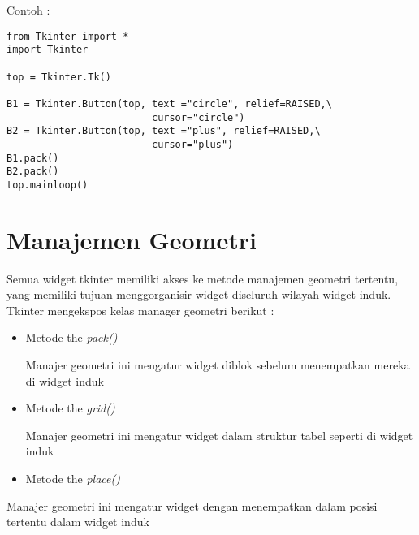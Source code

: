 \documentclass [12pt,a4paper,notitlepage,oneside,bahasa]{article}
\begin{document}
\vspace{12pt}
Contoh : \par
\begin{verbatim}
from Tkinter import *
import Tkinter

top = Tkinter.Tk()

B1 = Tkinter.Button(top, text ="circle", relief=RAISED,\
                         cursor="circle")
B2 = Tkinter.Button(top, text ="plus", relief=RAISED,\
                         cursor="plus")
B1.pack()
B2.pack()
top.mainloop()

\end{verbatim}
\section{Manajemen Geometri}
\noindent 
 \hspace*{0.5in} Semua widget tkinter memiliki akses ke metode manajemen geometri tertentu, yang memiliki tujuan menggorganisir widget diseluruh wilayah widget induk. Tkinter mengekspos kelas manager geometri berikut : \par
\noindent 
\begin{itemize}
	\item Metode the \textit{pack()} \par
	\noindent 
	Manajer geometri ini mengatur widget diblok sebelum menempatkan mereka di widget induk \par
	\noindent 
	\item Metode the \textit{grid()} \par
	\noindent 
	Manajer geometri ini mengatur widget dalam struktur tabel seperti di widget induk \par
	\noindent 
	\item Metode the  \textit{place()}\end{itemize} \par
	\noindent 
	Manajer geometri ini mengatur widget dengan menempatkan dalam posisi tertentu dalam widget induk \par
	\vspace{12pt}
	\noindent 
\end{document}
